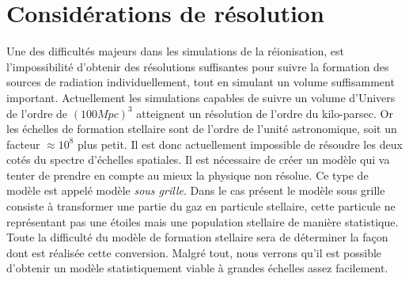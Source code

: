 \section{Considérations de résolution}

Une des difficultés majeurs dans les simulations de la réionisation, est l'impossibilité d'obtenir des résolutions suffisantes pour suivre la formation des sources de radiation individuellement, tout en simulant un volume suffisamment important.
Actuellement les simulations capables de suivre un volume d'Univers de l'ordre de $(100Mpc)^3$ atteignent un résolution de l'ordre du kilo-parsec.
Or les échelles de formation stellaire sont de l'ordre de l'unité astronomique, soit un facteur $\approx 10^8$ plus petit.
Il est donc actuellement impossible de résoudre les deux cotés du spectre d'échelles spatiales.
Il est nécessaire de créer un modèle qui va tenter de prendre en compte au mieux la physique non résolue.
Ce type de modèle est appelé modèle \textit{sous grille}.
Dans le cas présent le modèle sous grille consiste à transformer une partie du gaz en particule stellaire, cette particule ne représentant pas une étoiles mais une population stellaire de manière statistique.
Toute la difficulté du modèle de formation stellaire sera de déterminer la façon dont est réalisée cette conversion.
Malgré tout, nous verrons qu'il est possible d'obtenir un modèle statistiquement viable à grandes échelles assez facilement.



